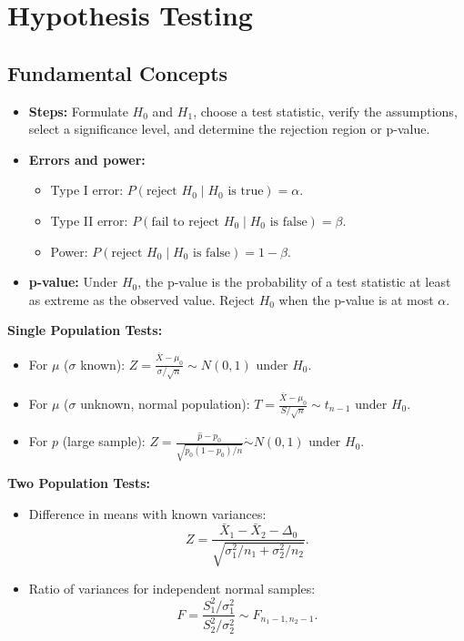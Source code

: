 \documentclass[12pt,a4paper]{article}
\begin{document}
\section{Hypothesis Testing}

\subsection{Fundamental Concepts}
\begin{itemize}
    \item \textbf{Steps:} Formulate $H_0$ and $H_1$, choose a test statistic,
    verify the assumptions, select a significance level, and determine the
    rejection region or p-value.
    \item \textbf{Errors and power:}
        \begin{itemize}
            \item Type I error:
            $P(\text{reject }H_0\mid H_0\text{ is true})=\alpha$.
            \item Type II error:
            $P(\text{fail to reject }H_0\mid H_0\text{ is false})=\beta$.
            \item Power:
            $P(\text{reject }H_0\mid H_0\text{ is false})=1-\beta$.
        \end{itemize}
    \item \textbf{p-value:} Under $H_0$, the p-value is the probability of a
    test statistic at least as extreme as the observed value. Reject $H_0$
    when the p-value is at most $\alpha$.
\end{itemize}

\begin{thmbox}[title=Tests for One and Two Populations]
\textbf{Single Population Tests:}
\begin{itemize}
    \item For $\mu$ ($\sigma$ known):
    $Z=\frac{\bar{X}-\mu_0}{\sigma/\sqrt{n}}\sim N(0,1)$ under $H_0$.
    \item For $\mu$ ($\sigma$ unknown, normal population):
    $T=\frac{\bar{X}-\mu_0}{S/\sqrt{n}}\sim t_{n-1}$ under $H_0$.
    \item For $p$ (large sample):
    $Z=\frac{\hat{p}-p_0}{\sqrt{p_0(1-p_0)/n}}
    \mathrel{\dot{\sim}}N(0,1)$ under $H_0$.
\end{itemize}
\textbf{Two Population Tests:}
\begin{itemize}
    \item Difference in means with known variances:
    \[
        Z=\frac{\bar{X}_1-\bar{X}_2-\Delta_0}
        {\sqrt{\sigma_1^2/n_1+\sigma_2^2/n_2}}.
    \]
    \item Ratio of variances for independent normal samples:
    \[
        F=\frac{S_1^2/\sigma_1^2}{S_2^2/\sigma_2^2}
        \sim F_{n_1-1,n_2-1}.
    \]
\end{itemize}
\end{thmbox}
\end{document}
